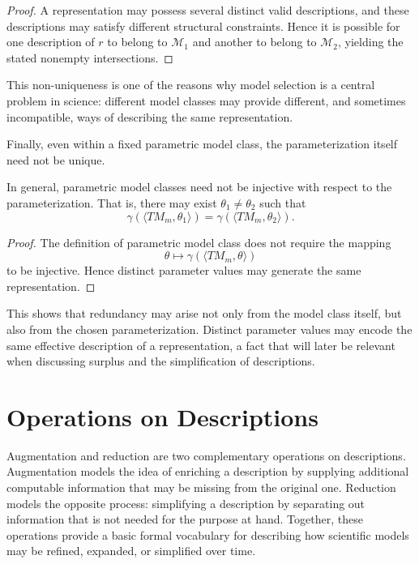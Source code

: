 \begin{proof}
A representation may possess several distinct valid descriptions, and these descriptions may satisfy different structural constraints. Hence it is possible for one description of \(r\) to belong to \(\mathcal{M}_1\) and another to belong to \(\mathcal{M}_2\), yielding the stated nonempty intersections.
\end{proof}

This non-uniqueness is one of the reasons why model selection is a central problem in science: different model classes may provide different, and sometimes incompatible, ways of describing the same representation.

Finally, even within a fixed parametric model class, the parameterization itself need not be unique.

\begin{proposition}
\label{prop:parametric_model_noninjective}
In general, parametric model classes need not be injective with respect to the parameterization. That is, there may exist \(\theta_1 \neq \theta_2\) such that
\[
\gamma(\langle TM_m, \theta_1 \rangle)
=
\gamma(\langle TM_m, \theta_2 \rangle).
\]
\end{proposition}

\begin{proof}
The definition of parametric model class does not require the mapping
\[
\theta \mapsto \gamma(\langle TM_m,\theta\rangle)
\]
to be injective. Hence distinct parameter values may generate the same representation.
\end{proof}

This shows that redundancy may arise not only from the model class itself, but also from the chosen parameterization. Distinct parameter values may encode the same effective description of a representation, a fact that will later be relevant when discussing surplus and the simplification of descriptions.

%
%

\section{Operations on Descriptions}

Augmentation and reduction are two complementary operations on descriptions. Augmentation models the idea of enriching a description by supplying additional computable information that may be missing from the original one. Reduction models the opposite process: simplifying a description by separating out information that is not needed for the purpose at hand. Together, these operations provide a basic formal vocabulary for describing how scientific models may be refined, expanded, or simplified over time.

